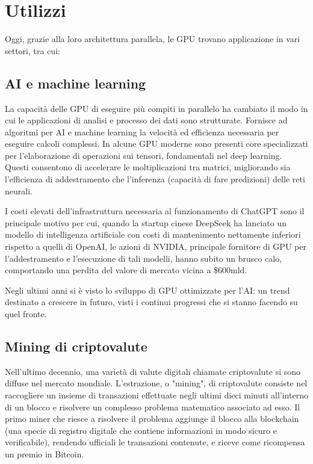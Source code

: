 \documentclass[12pt,a4paper,oneside]{book}
\begin{document}
\section{Utilizzi}
Oggi, grazie alla loro architettura parallela, le GPU trovano applicazione in vari settori, tra cui:

\subsection{AI e machine learning}

La capacità delle GPU di eseguire più compiti in parallelo ha cambiato il modo in cui le applicazioni di analisi e processo dei dati sono strutturate. Fornisce ad algoritmi per AI e machine learning la velocità ed efficienza necessaria per eseguire calcoli complessi.
In alcune GPU moderne sono presenti core specializzati per l'elaborazione di operazioni sui tensori, fondamentali nel deep learning. Questi consentono di accelerare le moltiplicazioni tra matrici, migliorando sia l'efficienza di addestramento che l'inferenza (capacità di fare predizioni) delle reti neurali.

I costi elevati dell'infrastruttura necessaria al funzionamento di ChatGPT sono il principale motivo per cui, quando la startup cinese DeepSeek ha lanciato un modello di intelligenza artificiale con costi di mantenimento nettamente inferiori rispetto a quelli di OpenAI, le azioni di NVIDIA, principale fornitore di GPU per l'addestramento e l'esecuzione di tali modelli, hanno subito un brusco calo, comportando una perdita del valore di mercato vicina a \$600mld.

Negli ultimi anni si è visto lo sviluppo di GPU ottimizzate per l'AI: un trend destinato a crescere in futuro, visti i continui progressi che si stanno facendo su quel fronte.

\subsection{Mining di criptovalute}

Nell'ultimo decennio, una varietà di valute digitali chiamate criptovalute si sono diffuse nel mercato mondiale. L'estrazione, o "mining", di criptovalute consiste nel raccogliere un insieme di transazioni effettuate negli ultimi dieci minuti all'interno di un blocco e risolvere un complesso problema matematico associato ad esso. Il primo miner che riesce a risolvere il problema aggiunge il blocco alla blockchain (una specie di registro digitale che contiene informazioni in modo sicuro e verificabile), rendendo ufficiali le transazioni contenute, e riceve come ricompensa un premio in Bitcoin.
\end{document}
